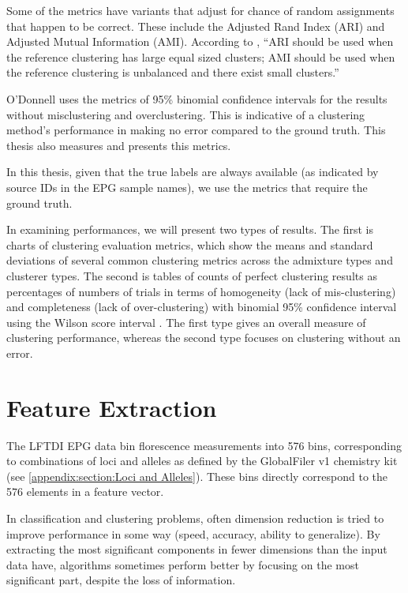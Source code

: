 Some of the metrics have variants that adjust for chance of random assignments that happen to be correct. These include the Adjusted Rand Index (ARI) and Adjusted Mutual Information (AMI). According to \cite{romano_adjusting_2015}, ``ARI should be used when the reference clustering has large equal sized clusters; AMI should be used when the reference clustering is unbalanced and there exist small clusters.''

O'Donnell \cite{odonnell_clustering_2021} uses the metrics of 95\% binomial confidence intervals for the results without misclustering and overclustering. This is indicative of a clustering method's performance in making no error compared to the ground truth. This thesis also measures and presents this metrics.

In this thesis, given that the true labels are always available (as indicated by source IDs in the EPG sample names), we use the metrics that require the ground truth.

In examining performances, we will present two types of results. The first is charts of clustering evaluation metrics, which show the means and standard deviations of several common clustering metrics across the admixture types and clusterer types. The second is tables of counts of perfect clustering results as percentages of numbers of trials in terms of homogeneity (lack of mis-clustering) and completeness (lack of over-clustering) with binomial 95\% confidence interval using the Wilson score interval \cite{wilson_probable_1927}. The first type gives an overall measure of clustering performance, whereas the second type focuses on clustering without an error.

\section{Feature Extraction}

The LFTDI EPG data bin florescence measurements into 576 bins, corresponding to combinations of loci and alleles as defined by the GlobalFiler v1 chemistry kit (see \cref{appendix:section:Loci and Alleles}). These bins directly correspond to the 576 elements in a feature vector.

In classification and clustering problems, often dimension reduction is tried to improve performance in some way (speed, accuracy, ability to generalize). By extracting the most significant components in fewer dimensions than the input data have, algorithms sometimes perform better by focusing on the most significant part, despite the loss of information.

